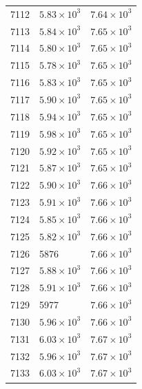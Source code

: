 \begin{table}[H]
\begin{tabular}{lll}
7112 & $\displaystyle 5.83 \times 10^{3}$ & $\displaystyle 7.64 \times 10^{3}$ \\
7113 & $\displaystyle 5.84 \times 10^{3}$ & $\displaystyle 7.65 \times 10^{3}$ \\
7114 & $\displaystyle 5.80 \times 10^{3}$ & $\displaystyle 7.65 \times 10^{3}$ \\
7115 & $\displaystyle 5.78 \times 10^{3}$ & $\displaystyle 7.65 \times 10^{3}$ \\
7116 & $\displaystyle 5.83 \times 10^{3}$ & $\displaystyle 7.65 \times 10^{3}$ \\
7117 & $\displaystyle 5.90 \times 10^{3}$ & $\displaystyle 7.65 \times 10^{3}$ \\
7118 & $\displaystyle 5.94 \times 10^{3}$ & $\displaystyle 7.65 \times 10^{3}$ \\
7119 & $\displaystyle 5.98 \times 10^{3}$ & $\displaystyle 7.65 \times 10^{3}$ \\
7120 & $\displaystyle 5.92 \times 10^{3}$ & $\displaystyle 7.65 \times 10^{3}$ \\
7121 & $\displaystyle 5.87 \times 10^{3}$ & $\displaystyle 7.65 \times 10^{3}$ \\
7122 & $\displaystyle 5.90 \times 10^{3}$ & $\displaystyle 7.66 \times 10^{3}$ \\
7123 & $\displaystyle 5.91 \times 10^{3}$ & $\displaystyle 7.66 \times 10^{3}$ \\
7124 & $\displaystyle 5.85 \times 10^{3}$ & $\displaystyle 7.66 \times 10^{3}$ \\
7125 & $\displaystyle 5.82 \times 10^{3}$ & $\displaystyle 7.66 \times 10^{3}$ \\
7126 & 5876 & $\displaystyle 7.66 \times 10^{3}$ \\
7127 & $\displaystyle 5.88 \times 10^{3}$ & $\displaystyle 7.66 \times 10^{3}$ \\
7128 & $\displaystyle 5.91 \times 10^{3}$ & $\displaystyle 7.66 \times 10^{3}$ \\
7129 & 5977 & $\displaystyle 7.66 \times 10^{3}$ \\
7130 & $\displaystyle 5.96 \times 10^{3}$ & $\displaystyle 7.66 \times 10^{3}$ \\
7131 & $\displaystyle 6.03 \times 10^{3}$ & $\displaystyle 7.67 \times 10^{3}$ \\
7132 & $\displaystyle 5.96 \times 10^{3}$ & $\displaystyle 7.67 \times 10^{3}$ \\
7133 & $\displaystyle 6.03 \times 10^{3}$ & $\displaystyle 7.67 \times 10^{3}$ \\

\end{tabular}
\end{table}
